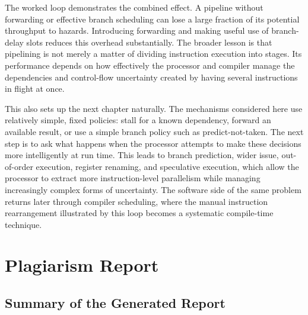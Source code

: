\documentclass[12pt,a4paper]{report}
\begin{document}
The worked loop demonstrates the combined effect. A pipeline without forwarding or effective branch scheduling can lose a large fraction of its potential throughput to hazards. Introducing forwarding and making useful use of branch-delay slots reduces this overhead substantially. The broader lesson is that pipelining is not merely a matter of dividing instruction execution into stages. Its performance depends on how effectively the processor and compiler manage the dependencies and control-flow uncertainty created by having several instructions in flight at once.

This also sets up the next chapter naturally. The mechanisms considered here use relatively simple, fixed policies: stall for a known dependency, forward an available result, or use a simple branch policy such as predict-not-taken. The next step is to ask what happens when the processor attempts to make these decisions more intelligently at run time. This leads to branch prediction, wider issue, out-of-order execution, register renaming, and speculative execution, which allow the processor to extract more instruction-level parallelism while managing increasingly complex forms of uncertainty. The software side of the same problem returns later through compiler scheduling, where the manual instruction rearrangement illustrated by this loop becomes a systematic compile-time technique.~\cite{sarangi}



\appendix

\chapter{Plagiarism Report}
\label{app:plagiarism}

\section{Summary of the Generated Report}
\label{sec:plagiarism-summary}
\end{document}
